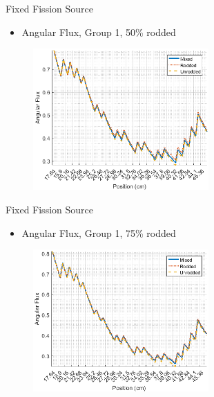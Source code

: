 
\begin{frame}[t]{Fixed Fission Source}

\begin{itemize}
  \item Angular Flux, Group 1, 50\% rodded
\end{itemize}
\begin{figure}[H]
  \centering
  \includegraphics[width=0.6\textwidth]{../figs/1dmoc-50mix-angflux1.png}
\end{figure}

\end{frame}


\begin{frame}[t]{Fixed Fission Source}

\begin{itemize}
  \item Angular Flux, Group 1, 75\% rodded
\end{itemize}
\begin{figure}[H]
  \centering
  \includegraphics[width=0.6\textwidth]{../figs/1dmoc-75mix-angflux1.png}
\end{figure}

\end{frame}

